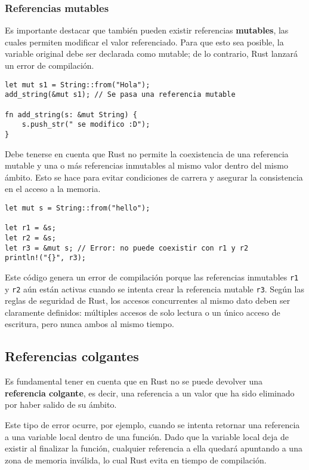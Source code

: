 \documentclass[12pt]{article}
\begin{document}
\subsubsection{Referencias mutables}

Es importante destacar que también pueden existir referencias \textbf{mutables}, las cuales permiten modificar el valor referenciado. Para que esto sea posible, la variable original debe ser declarada como mutable; de lo contrario, Rust lanzará un error de compilación.

\begin{lstlisting}[style=ruststyle]
let mut s1 = String::from("Hola");
add_string(&mut s1); // Se pasa una referencia mutable

fn add_string(s: &mut String) {
	s.push_str(" se modifico :D");
}
\end{lstlisting}

Debe tenerse en cuenta que Rust no permite la coexistencia de una referencia mutable y una o más referencias inmutables al mismo valor dentro del mismo ámbito. Esto se hace para evitar condiciones de carrera y asegurar la consistencia en el acceso a la memoria.

\begin{lstlisting}[style=ruststyle]
let mut s = String::from("hello");

let r1 = &s;
let r2 = &s;
let r3 = &mut s; // Error: no puede coexistir con r1 y r2
println!("{}", r3);
\end{lstlisting}

Este código genera un error de compilación porque las referencias inmutables \texttt{r1} y \texttt{r2} aún están activas cuando se intenta crear la referencia mutable \texttt{r3}. Según las reglas de seguridad de Rust, los accesos concurrentes al mismo dato deben ser claramente definidos: múltiples accesos de solo lectura o un único acceso de escritura, pero nunca ambos al mismo tiempo.

\subsection{Referencias colgantes}

Es fundamental tener en cuenta que en Rust no se puede devolver una \textbf{referencia colgante}, es decir, una referencia a un valor que ha sido eliminado por haber salido de su ámbito.

Este tipo de error ocurre, por ejemplo, cuando se intenta retornar una referencia a una variable local dentro de una función. Dado que la variable local deja de existir al finalizar la función, cualquier referencia a ella quedará apuntando a una zona de memoria inválida, lo cual Rust evita en tiempo de compilación.
\end{document}
